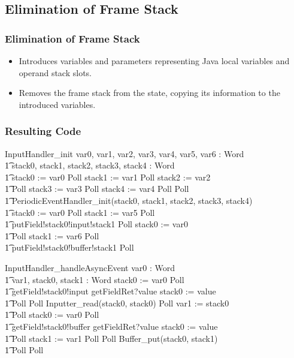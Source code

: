 \documentclass{beamer}
\begin{document}
\subsection{Elimination of Frame Stack}

\begin{frame}
  \frametitle{Elimination of Frame Stack}
  \begin{itemize}
  \item Introduces variables and parameters representing Java local
    variables and operand stack slots.
  \item Removes the frame stack from the state, copying its
    information to the introduced variables.
  \end{itemize}
\end{frame}

\begin{frame}[shrink]
  \frametitle{Resulting Code}
  \setlength{\zedleftsep}{0cm}
  \setlength{\zedindent}{0cm}
  \begin{circus}
    InputHandler\_init \circdef \circval var0, var1, var2, var3, var4, var5, var6 : Word  \circspot \\
    \t1 \circvar stack0, stack1, stack2, stack3, stack4 : Word \circspot \\
    \t1 stack0 := var0 \circseq Poll \circseq stack1 := var1 \circseq Poll \circseq stack2 := var2 \circseq \\
    \t1 Poll \circseq stack3 := var3 \circseq Poll \circseq stack4 := var4 \circseq Poll \circseq Poll \\
    \t1 PeriodicEventHandler\_init(stack0, stack1, stack2, stack3, stack4) \circseq \\
    \t1 stack0 := var0 \circseq Poll \circseq stack1 := var5 \circseq Poll \circseq \\
    \t1 putField!stack0!input!stack1 \then \Skip \circseq Poll \circseq stack0 := var0 \circseq \\
    \t1 Poll \circseq stack1 := var6 \circseq Poll \circseq \\
    \t1 putField!stack0!buffer!stack1 \then \Skip \circseq Poll
  \end{circus}
  \begin{circus}
    InputHandler\_handleAsyncEvent \circdef \circval var0 : Word \circspot \\
    \t1 \circvar var1, stack0, stack1 : Word \circspot stack0 := var0 \circseq Poll \circseq \\
    \t1 getField!stack0!input \then getFieldRet?value \then stack0 := value \circseq \\
    \t1 Poll \circseq Poll \circseq Inputter\_read(stack0, stack0) \circseq Poll \circseq var1 := stack0 \circseq \\
    \t1 Poll \circseq stack0 := var0 \circseq Poll \circseq \\
    \t1 getField!stack0!buffer \then getFieldRet?value \then stack0 := value \circseq \\
    \t1 Poll \circseq stack1 := var1 \circseq Poll \circseq Poll \circseq Buffer\_put(stack0, stack1) \circseq \\
    \t1 Poll \circseq Poll
  \end{circus}
\end{frame}
\end{document}
